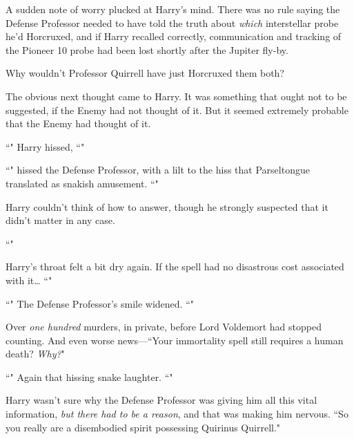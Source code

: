 A sudden note of worry plucked at Harry's mind. There was no rule saying the Defense Professor needed to have told the truth about \emph{which} interstellar probe he'd Horcruxed, and if Harry recalled correctly, communication and tracking of the Pioneer 10 probe had been lost shortly after the Jupiter fly-by.

Why wouldn't Professor Quirrell have just Horcruxed them both?

The obvious next thought came to Harry. It was something that ought not to be suggested, if the Enemy had not thought of it. But it seemed extremely probable that the Enemy had thought of it.

``" Harry hissed, ``"

``" hissed the Defense Professor, with a lilt to the hiss that Parseltongue translated as snakish amusement. ``"

Harry couldn't think of how to answer, though he strongly suspected that it didn't matter in any case.

``"

Harry's throat felt a bit dry again. If the spell had no disastrous cost associated with it{\ldots} ``"

``" The Defense Professor's smile widened. ``"

Over \emph{one hundred} murders, in private, before Lord Voldemort had stopped counting. And even worse news—``Your immortality spell still requires a human death? \emph{Why?}"

``" Again that hissing snake laughter. ``"

Harry wasn't sure why the Defense Professor was giving him all this vital information, \emph{but there had to be a reason}, and that was making him nervous. ``So you really are a disembodied spirit possessing Quirinus Quirrell."

